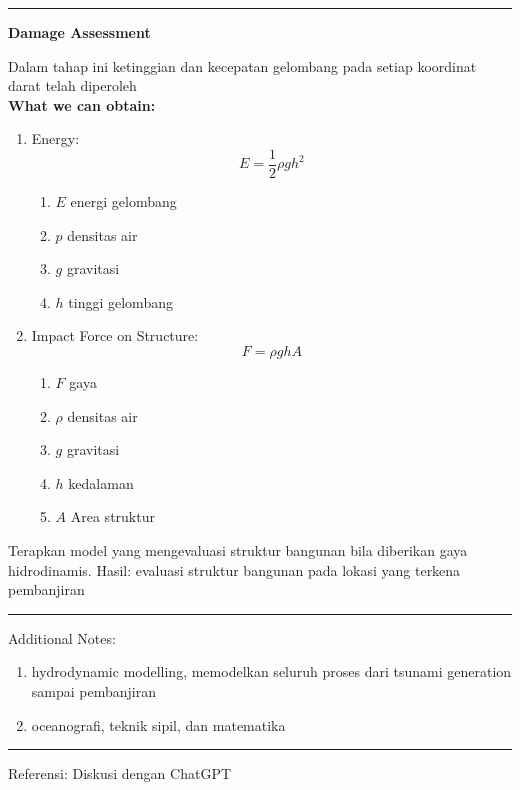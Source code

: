 \documentclass{article}
\begin{document}
\vspace{0.5cm}\hrule height 2pt\vspace{0.5cm}
\begin{center}
    \textbf{Damage Assessment}
\end{center}
Dalam tahap ini ketinggian dan kecepatan gelombang pada setiap koordinat darat telah diperoleh\\
\noindent\textbf{What we can obtain:}
\begin{enumerate}
    \item Energy:
    \[
        E = \frac{1}{2}\rho g h^2
    \]
    \begin{enumerate}
        \item $E$ energi gelombang
        \item $p$ densitas air
        \item $g$ gravitasi
        \item $h$ tinggi gelombang
    \end{enumerate}
    \item Impact Force on Structure:
    \[
        F = \rho g h A
    \]
    \begin{enumerate}
        \item $F$ gaya
        \item $\rho$ densitas air
        \item $g$ gravitasi
        \item $h$ kedalaman
        \item $A$ Area struktur
    \end{enumerate}
\end{enumerate}
Terapkan model yang mengevaluasi struktur bangunan bila diberikan gaya hidrodinamis.
Hasil: evaluasi struktur bangunan pada lokasi yang terkena pembanjiran

\vspace{0.5cm}\hrule height 2pt\vspace{0.5cm}

\noindent Additional Notes:
\begin{enumerate}
    \item hydrodynamic modelling, memodelkan seluruh proses dari tsunami generation sampai pembanjiran
    \item oceanografi, teknik sipil, dan matematika
\end{enumerate}

\vspace{0.5cm}\hrule height 2pt\vspace{0.5cm}

Referensi: 
Diskusi dengan ChatGPT
\end{document}
